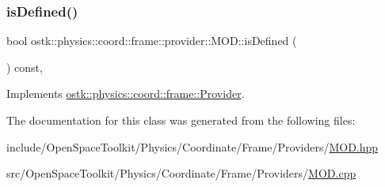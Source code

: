 \mbox{\label{classostk_1_1physics_1_1coord_1_1frame_1_1provider_1_1_m_o_d_a0b6a40a222857ad032f5d5a8d228ab16}} 
\subsubsection{\texorpdfstring{is\+Defined()}{isDefined()}}
{\footnotesize\ttfamily bool ostk\+::physics\+::coord\+::frame\+::provider\+::\+M\+O\+D\+::is\+Defined (\begin{DoxyParamCaption}{ }\end{DoxyParamCaption}) const\hspace{0.3cm}{\ttfamily [override]}, {\ttfamily [virtual]}}



Implements \hyperlink{classostk_1_1physics_1_1coord_1_1frame_1_1_provider_a27acab0012649796b97956fed1a91493}{ostk\+::physics\+::coord\+::frame\+::\+Provider}.



The documentation for this class was generated from the following files\+:\begin{DoxyCompactItemize}
\item 
include/\+Open\+Space\+Toolkit/\+Physics/\+Coordinate/\+Frame/\+Providers/\hyperlink{_m_o_d_8hpp}{M\+O\+D.\+hpp}\item 
src/\+Open\+Space\+Toolkit/\+Physics/\+Coordinate/\+Frame/\+Providers/\hyperlink{_m_o_d_8cpp}{M\+O\+D.\+cpp}\end{DoxyCompactItemize}
